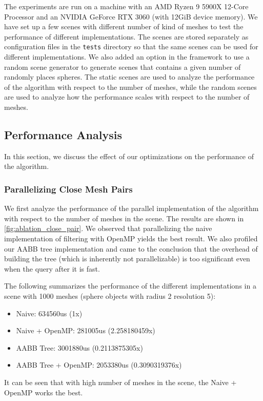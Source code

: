 \documentclass[12pt,fleqn]{article}
\newcommand{\code}[1]{\texttt{#1}}
\begin{document}
The experiments are run on a machine with an AMD Ryzen 9 5900X 12-Core Processor and an NVIDIA GeForce RTX 3060 (with 12GiB device memory).
We have set up a few scenes with different number of kind of meshes to test the performance of different implementations.
The scenes are stored separately as configuration files in the \code{tests} directory so that the same scenes can be used for different implementations.
We also added an option in the framework to use a random scene generator to generate scenes that contains a given number of randomly places spheres.
The static scenes are used to analyze the performance of the algorithm with respect to the number of meshes, while the random scenes are used to analyze how the performance scales with respect to the number of meshes.

\subsection{Performance Analysis}
In this section, we discuss the effect of our optimizations on the performance of the algorithm.

\subsubsection{Parallelizing Close Mesh Pairs}
We first analyze the performance of the parallel implementation of the algorithm with respect to the number of meshes in the scene. The results are shown in \ref{fig:ablation_close_pair}. We observed that parallelizing the naive implementation of filtering with OpenMP yields the best result. We also profiled our AABB tree implementation and came to the conclusion that the overhead of building the tree (which is inherently not parallelizable) is too significant even when the query after it is fast.

The following summarizes the performance of the different implementations in a scene with 1000 meshes (sphere objects with radius 2 resolution 5):
\begin{itemize}
    \item Naive:                634560us (1x)
    \item Naive + OpenMP:       281005us (2.258180459x)
    \item AABB Tree:            3001880us (0.2113875305x)
    \item AABB Tree + OpenMP:   2053380us (0.3090319376x)
\end{itemize}

It can be seen that with high number of meshes in the scene, the Naive + OpenMP works the best.
\end{document}
